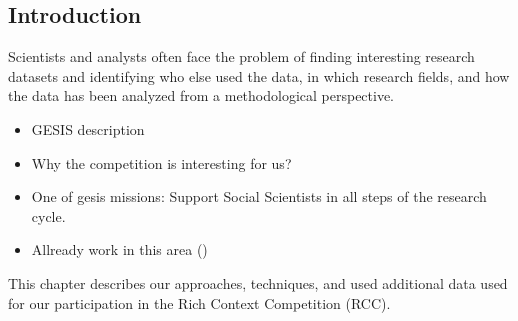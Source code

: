 \subsection {Introduction}
Scientists and analysts often face the problem of finding interesting research datasets and identifying who else used the data, in which research fields, and how the data has been analyzed from a methodological perspective.
\begin{itemize}
    \item GESIS description
    \item Why the competition is interesting for us?
    \item One of gesis missions: Support Social Scientists in all steps of the research cycle.
    \item Allready work in this area (\cite{boland2012identifying}\cite{ghavimi2016semi})
\end{itemize}

This chapter describes our approaches, techniques, and used additional data used for our participation in the Rich Context Competition (RCC).


